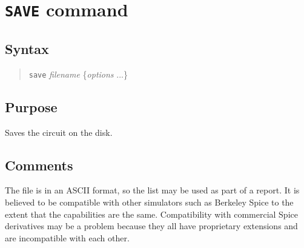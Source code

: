 %
%
%
%
\section{{\tt SAVE} command}
\subsection{Syntax}
\begin{verse}
{\tt save} {\it filename} \{{\it options} ...\}
\end{verse}
\subsection{Purpose}

Saves the circuit on the disk.
\subsection{Comments}

The file is in an ASCII format, so the list may be used as part of a
report.  It is believed to be compatible with other simulators such as 
Berkeley Spice to the extent that the capabilities are the same.  
Compatibility with commercial Spice derivatives may be a problem because
they all have proprietary extensions and are incompatible with each other.


